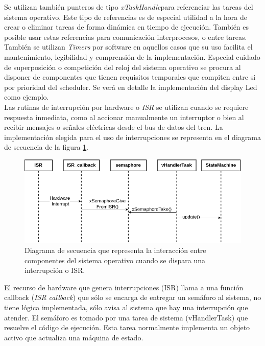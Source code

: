 Se utilizan también punteros de tipo \textit{xTaskHandle}para referenciar las tareas del sistema operativo. Este tipo de referencias es de especial utilidad a la hora de crear o eliminar tareas de forma dinámica en tiempo de ejecución. También es posible usar estas referencias para comunicación interprocesos, o entre tareas.\\

También se utilizan \textit{Timers} por software en aquellos casos que su uso facilita el mantenimiento, legibilidad y comprensión de la implementación. Especial cuidado de superposición o competición del reloj del sistema operativo se procura al disponer de componentes que tienen requisitos temporales que compiten entre si por prioridad del scheduler. Se verá en detalle la implementación del display Led como ejemplo.\\

Las rutinas de interrupción por hardware o \textit{ISR} se utilizan cuando se requiere respuesta inmediata, como al accionar manualmente un interruptor o bien al recibir mensajes o señales eléctricas desde el bus de datos del tren. La implementación elegida para el uso de interrupciones se representa en el diagrama de secuencia de la figura \ref{fig:ISR}. \\

\begin{figure}[ht]
	\centering
	\includegraphics[width=1\textwidth]{./Figures/ISR_semaphore.png}
	\caption{Diagrama de secuencia que representa la interacción entre componentes del sistema operativo cuando se dispara una interrupción o ISR.}
	\label{fig:ISR}
\end{figure}

El recurso de hardware que genera interrupciones (ISR) llama a una función callback (\textit{ISR callback}) que sólo se encarga de entregar un semáforo al sistema, no tiene lógica implementada, sólo avisa al sistema que hay una interrupción que atender. El semáforo es tomado por una tarea de sistema (vHandlerTask) que resuelve el código de ejecución. Esta tarea normalmente implementa un objeto activo que actualiza una máquina de estado.\\

